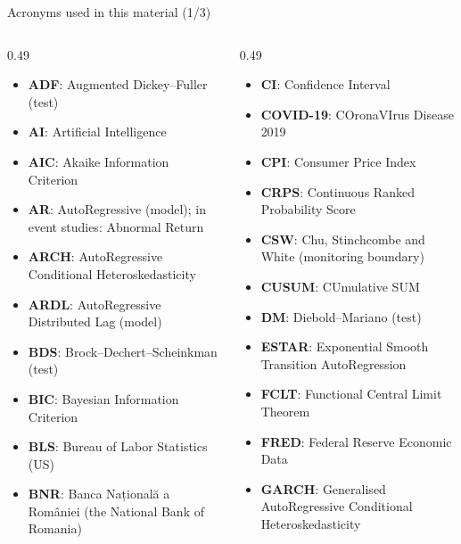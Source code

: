 \begin{frame}{Acronyms used in this material (1/3)}
\begin{columns}[T]
\begin{column}{0.49\textwidth}
\begin{itemize}\setlength{\itemsep}{0pt}
    \item \textbf{ADF}: Augmented Dickey–Fuller (test)
    \item \textbf{AI}: Artificial Intelligence
    \item \textbf{AIC}: Akaike Information Criterion
    \item \textbf{AR}: AutoRegressive (model); in event studies: Abnormal Return
    \item \textbf{ARCH}: AutoRegressive Conditional Heteroskedasticity
    \item \textbf{ARDL}: AutoRegressive Distributed Lag (model)
    \item \textbf{BDS}: Brock–Dechert–Scheinkman (test)
    \item \textbf{BIC}: Bayesian Information Criterion
    \item \textbf{BLS}: Bureau of Labor Statistics (US)
    \item \textbf{BNR}: Banca Națională a României (the National Bank of Romania)
\end{itemize}
\end{column}
\begin{column}{0.49\textwidth}
\begin{itemize}\setlength{\itemsep}{0pt}
    \item \textbf{CI}: Confidence Interval
    \item \textbf{COVID-19}: COronaVIrus Disease 2019
    \item \textbf{CPI}: Consumer Price Index
    \item \textbf{CRPS}: Continuous Ranked Probability Score
    \item \textbf{CSW}: Chu, Stinchcombe and White (monitoring boundary)
    \item \textbf{CUSUM}: CUmulative SUM
    \item \textbf{DM}: Diebold–Mariano (test)
    \item \textbf{ESTAR}: Exponential Smooth Transition AutoRegression
    \item \textbf{FCLT}: Functional Central Limit Theorem
    \item \textbf{FRED}: Federal Reserve Economic Data
    \item \textbf{GARCH}: Generalised AutoRegressive Conditional Heteroskedasticity
\end{itemize}
\end{column}
\end{columns}
\end{frame}
